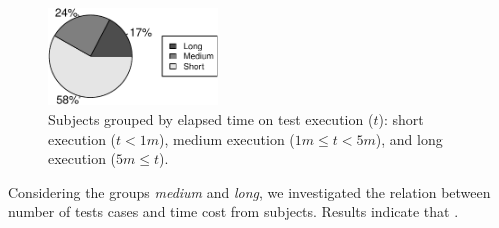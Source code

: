 \begin{figure}[h!]
    \centering
    \includegraphics[width=0.4\textwidth]{results/rq1/plots/piechart.pdf}
    \caption{\label{fig:piechart-time} Subjects grouped by elapsed
    time on test execution ($t$): short execution ($t < 1m$), medium 
    execution ($1m \leq t < 5m$), and long execution ($5m \leq t$).}
\end{figure}

Considering the groups \emph{medium} and \emph{long}, we investigated
the relation between number of tests cases and time cost from
subjects.   Results
indicate that .

\begin{figure}[h!]%
    \centering
    \begin{minipage}{0.5\textwidth}
        \\
    \end{minipage}%
    \caption{}%
    \label{fig:scatters}%
\end{figure}


